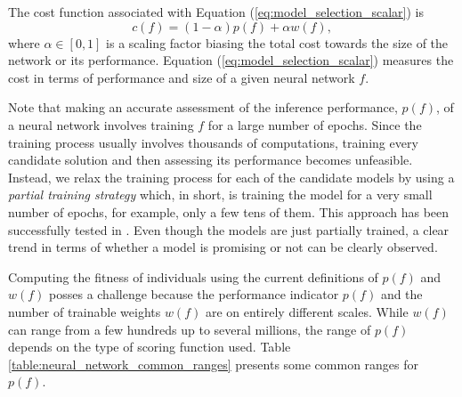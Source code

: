 \documentclass[12pt]{elsart}%
\begin{document}
The cost function associated with Equation (\ref{eq:model_selection_scalar}) is
\begin{equation}
c(f) = (1-\alpha)p(f) + \alpha w(f), 
\label{eq:fitness_function_scalar}
\end{equation}
where $\alpha \in \left[0,1\right]$ is a scaling factor biasing the total cost towards the size of the network or its performance. Equation (\ref{eq:model_selection_scalar}) measures the cost in terms of performance and size of a given neural network $f$.

Note that making an accurate assessment of the inference performance, $p(f)$, of a neural network involves training $f$ for a large number of epochs. Since the training process usually involves thousands of computations, training every candidate solution and then assessing its performance becomes unfeasible. Instead, we relax the training process for each of the candidate models by using a \textit{partial training strategy} which, in short, is training the model for a very small number of epochs, for example, only a few tens of them. This approach has been successfully tested in \cite{Laredo2018}. Even though the models are just partially trained, a clear trend in terms of whether a model is promising or not can be clearly observed.

Computing the fitness of individuals using the current definitions of $p(f)$ and $w(f)$ posses a challenge because the performance indicator $p(f)$ and the number of trainable weights $w(f)$ are on entirely different scales. While $w(f)$ can range from a few hundreds up to several millions, the range of $p(f)$ depends on the type of scoring function used. Table \ref{table:neural_network_common_ranges} presents some common ranges for $p(f)$. 

\begin{table}[!htb]
\begin{center}
\end{center}
\caption{Common ranges for some neural network performance indicators.}
\label{table:neural_network_common_ranges}
\end{table}
\end{document}
